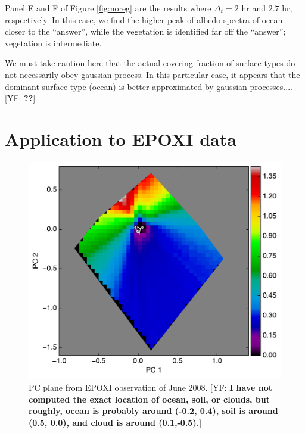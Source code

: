 \documentclass[iop,numberedappendix,apj,]{emulateapj}
\def\fast{\tilde f}
\def\memoYF#1{\color{red}[YF: {\bf #1}]\color{black}}
\begin{document}
Panel E and F of Figure \ref{fig:noreg} are the results where $\Delta_ t = 2$ hr and $2.7$ hr, respectively. 
In this case, we find the higher peak of albedo spectra of ocean closer to the ``answer'', while the vegetation is identified far off the ``answer''; vegetation is intermediate. 

We must take caution here that the actual covering fraction of surface types do not necessarily obey gaussian process. 
In this particular case, it appears that the dominant surface type (ocean) is better approximated by gaussian processes.... \memoYF{??}



\section{Application to EPOXI data}
\label{s:EPOXI}

\begin{figure}[tbh!]
    \begin{center}
	\includegraphics[width=\hsize]{raddata_2_PCplane_noreg.pdf}
    \end{center}
    \caption{PC plane from EPOXI observation of June 2008. \memoYF{I have not computed the exact location of ocean, soil, or clouds, but roughly, ocean is probably around (-0.2, 0.4), soil is around (0.5, 0.0), and cloud is around (0.1,-0.5).}}
\label{fig:EPOXI}
\end{figure}
\end{document}
